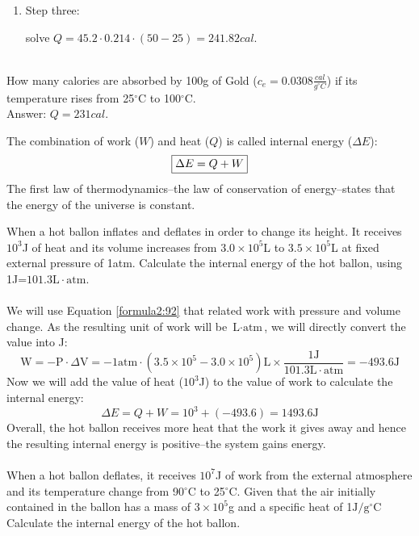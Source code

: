 \documentclass[main.tex]{subfiles}
\newcommand\chapterlabel{energy}
\begin{document}
\begin{description}
\begin{example}
\begin{enumerate}[label=\protect\circled{\color{white}\arabic*}]
\begin{tikzpicture}[overlay, remember picture,node distance =1.5cm]
\end{tikzpicture}\vspace{12mm} %
\item \begin{bf}Step three:\end{bf} solve $Q=45.2\cdot 0.214\cdot  (50-25)=241.82cal$.
\end{enumerate}
\faDiamond\ \\
How many calories are absorbed by 100g of Gold ($c_e=0.0308\frac{cal}{g^{\circ}C}$) if its temperature rises from 25$^{\circ}$C to 100$^{\circ}$C. \\
\flushright Answer: $Q=231cal$.
\end{example}%


\item[\docfilehook{First law of thermodynamics: the internal energy}{}] 
The combination of work ($W$) and heat ($Q$) is called internal energy ($\Delta E$):
\begin{equation}
\boxed{    \Delta E=Q+W  } 
\label{formula:{\chapterlabel}}
\end{equation}
The first law of thermodynamics--the law of conservation of energy--states that the energy of the universe is constant.

\begin{example} %
When a hot ballon inflates and deflates in order to change its height. It receives $10^3$J of heat and its volume increases from $3.0\times 10^{5}$L to $3.5\times 10^{5}$L at fixed external pressure of 1atm. Calculate the internal energy of the hot ballon, using 1J=$101.3\text{L}\cdot \text{atm}$.
\\
\\
We will use Equation \ref{formula2:92} that related work with pressure and volume change. As the resulting unit of work will be $ \text{L}\cdot \text{atm}$, we will directly convert the value into J: 
\[\text{W} = -\text{P}\cdot \Delta \text{V}=-1\text{atm}\cdot (3.5\times 10^{5}-3.0\times 10^{5})\text{L}\times \frac{1\text{J}}{101.3\text{L}\cdot \text{atm}}=-493.6 \text{J} \]
Now we will add the value of heat ($10^3$J) to the value of work to calculate the internal energy:
\[\Delta E= Q+W=10^3 + (-493.6)=1493.6 \text{J} \]
Overall, the hot ballon receives more heat that the work it gives away and hence the resulting internal energy is positive--the system gains energy.\\
\faDiamond\ \\
When a hot ballon deflates, it receives $10^7$J of work from the external atmosphere and its temperature change from 90$^{\circ}$C to 25$^{\circ}$C. Given that the air initially contained in the ballon has a mass of $3\times 10^5$g and a specific heat of 1$\text{J}/\text{g}^{\circ}\text{C}$
 Calculate the internal energy of the hot ballon.


\end{example}
\end{description}
\end{document}
